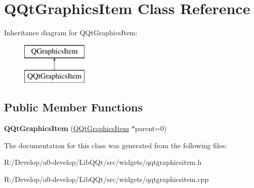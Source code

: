 \hypertarget{class_q_qt_graphics_item}{}\section{Q\+Qt\+Graphics\+Item Class Reference}
\label{class_q_qt_graphics_item}
Inheritance diagram for Q\+Qt\+Graphics\+Item\+:\begin{figure}[H]
\begin{center}
\leavevmode
\includegraphics[height=2.000000cm]{class_q_qt_graphics_item}
\end{center}
\end{figure}
\subsection*{Public Member Functions}
\begin{DoxyCompactItemize}
\item 
\mbox{\label{class_q_qt_graphics_item_a95ba8ad667de4daf24da9f03a8cc468d}} 
{\bfseries Q\+Qt\+Graphics\+Item} (\mbox{\hyperlink{class_q_qt_graphics_item}{Q\+Qt\+Graphics\+Item}} $\ast$parent=0)
\end{DoxyCompactItemize}


The documentation for this class was generated from the following files\+:\begin{DoxyCompactItemize}
\item 
R\+:/\+Develop/a0-\/develop/\+Lib\+Q\+Qt/src/widgets/qqtgraphicsitem.\+h\item 
R\+:/\+Develop/a0-\/develop/\+Lib\+Q\+Qt/src/widgets/qqtgraphicsitem.\+cpp\end{DoxyCompactItemize}
